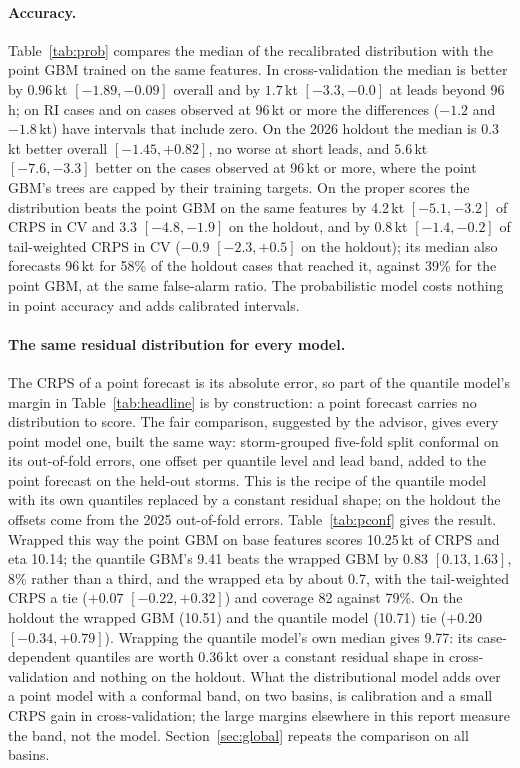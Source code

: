 \documentclass[11pt]{article}
\begin{document}
\paragraph{Accuracy.} Table~\ref{tab:prob} compares the median of the recalibrated distribution
with the point GBM trained on the same features. In cross-validation the median is better by
$0.96$\,kt $[-1.89, -0.09]$ overall and by $1.7$\,kt $[-3.3, -0.0]$ at leads beyond 96\,h; on RI
cases and on cases observed at 96\,kt or more the differences ($-1.2$ and $-1.8$\,kt) have
intervals that include zero. On the 2026 holdout the median is $0.3$\,kt better overall
$[-1.45, +0.82]$, no worse at short leads, and $5.6$\,kt $[-7.6, -3.3]$ better on the cases
observed at 96\,kt or more, where the point GBM's trees are capped by their training targets. On
the proper scores the distribution beats the point GBM on the same features by 4.2\,kt
$[-5.1, -3.2]$ of CRPS in CV and 3.3 $[-4.8, -1.9]$ on the holdout, and by $0.8$\,kt
$[-1.4, -0.2]$ of tail-weighted CRPS in CV ($-0.9$ $[-2.3, +0.5]$ on the holdout); its median
also forecasts 96\,kt for 58\% of the holdout
cases that reached it, against 39\% for the point GBM, at the same false-alarm ratio. The
probabilistic model costs nothing in point accuracy and adds calibrated intervals.

\paragraph{The same residual distribution for every model.} The CRPS of a point forecast is
its absolute error, so part of the quantile model's margin in Table~\ref{tab:headline} is by
construction: a point forecast carries no distribution to score. The fair comparison, suggested
by the advisor, gives every point model one, built the same way: storm-grouped five-fold split
conformal on its out-of-fold errors, one offset per quantile level and lead band, added to the
point forecast on the held-out storms. This is the recipe of the quantile model with its own
quantiles replaced by a constant residual shape; on the holdout the offsets come from the 2025
out-of-fold errors. Table~\ref{tab:pconf} gives the result. Wrapped this way the point GBM on
base features scores 10.25\,kt of CRPS and eta 10.14; the quantile GBM's 9.41 beats the wrapped
GBM by $0.83$ $[0.13, 1.63]$, 8\% rather than a third, and the wrapped eta by about 0.7, with the
tail-weighted CRPS a tie ($+0.07$ $[-0.22, +0.32]$) and coverage 82 against 79\%. On the holdout
the wrapped GBM (10.51) and the quantile model (10.71) tie ($+0.20$ $[-0.34, +0.79]$). Wrapping
the quantile model's own median gives 9.77: its case-dependent quantiles are worth 0.36\,kt over
a constant residual shape in cross-validation and nothing on the holdout. What the distributional
model adds over a point model with a conformal band, on two basins, is calibration and a small
CRPS gain in cross-validation; the large margins elsewhere in this report measure the band, not
the model. Section~\ref{sec:global} repeats the comparison on all basins.
\end{document}

